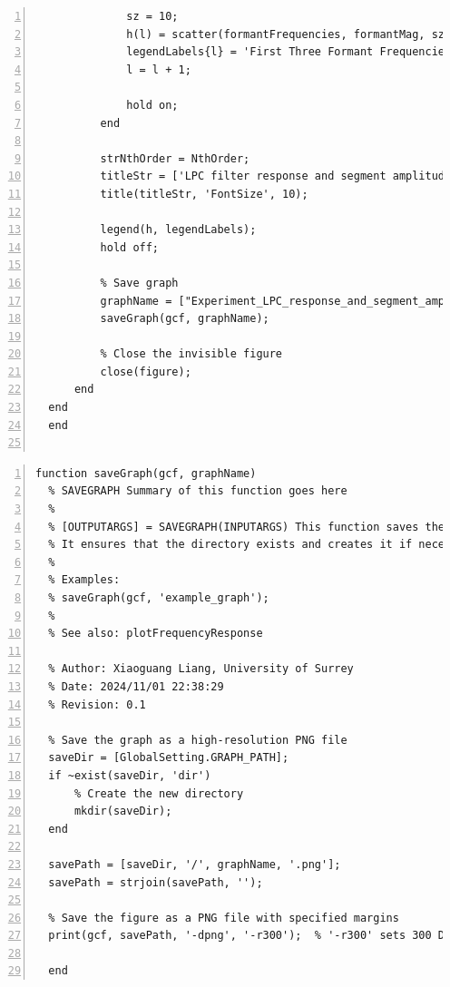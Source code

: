 \documentclass{article}
\begin{document}
\begin{lstlisting}[frame=single, numbers=left, style=Matlab-editor, caption={plotExperimentGraph.m}, label={lst:plotExperimentGraph}]
              % Plot the formant frequencies points
              sz = 10;
              h(l) = scatter(formantFrequencies, formantMag, sz, "filled", "o", "MarkerFaceColor", 'k');
              legendLabels{l} = 'First Three Formant Frequencies';
              l = l + 1;
  
              hold on;
          end
  
          strNthOrder = NthOrder;
          titleStr = ['LPC filter response and segment amplitude spectrum for ', gender, ' vowel. ', 'Order:', strNthOrder, ', different Segment Length'];
          title(titleStr, 'FontSize', 10);
  
          legend(h, legendLabels);
          hold off;
  
          % Save graph
          graphName = ["Experiment_LPC_response_and_segment_amplitude_spectrum_", gender, '_Order_', strNthOrder, '_different_segment_lengths'];
          saveGraph(gcf, graphName);
  
          % Close the invisible figure
          close(figure);
      end
  end
  end


\end{lstlisting}

\begin{lstlisting}[frame=single, numbers=left, style=Matlab-editor, caption={saveGraph.m}, label={lst:saveGraph}]
  function saveGraph(gcf, graphName)
  % SAVEGRAPH Summary of this function goes here
  %
  % [OUTPUTARGS] = SAVEGRAPH(INPUTARGS) This function saves the current figure as a high-resolution PNG file.
  % It ensures that the directory exists and creates it if necessary.
  %
  % Examples:
  % saveGraph(gcf, 'example_graph');
  %
  % See also: plotFrequencyResponse
  
  % Author: Xiaoguang Liang, University of Surrey
  % Date: 2024/11/01 22:38:29
  % Revision: 0.1
  
  % Save the graph as a high-resolution PNG file
  saveDir = [GlobalSetting.GRAPH_PATH];
  if ~exist(saveDir, 'dir')
      % Create the new directory
      mkdir(saveDir);
  end
  
  savePath = [saveDir, '/', graphName, '.png'];
  savePath = strjoin(savePath, '');
  
  % Save the figure as a PNG file with specified margins
  print(gcf, savePath, '-dpng', '-r300');  % '-r300' sets 300 DPI for high resolution
  
  end

\end{lstlisting}
\end{document}
